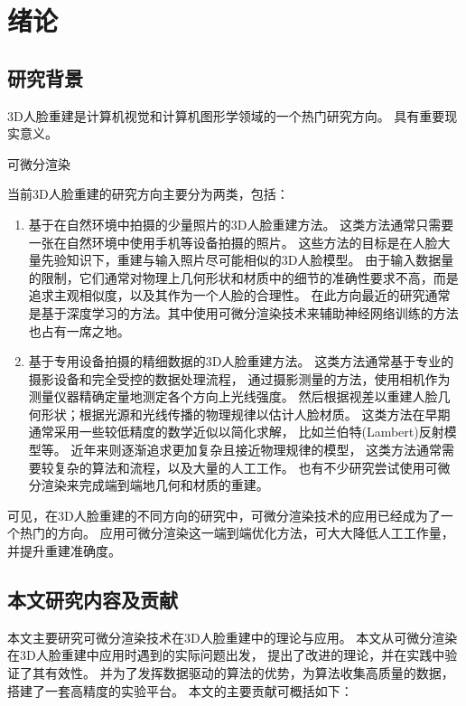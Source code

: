 \chapter{绪论}
\label{chap:intro}

\section{研究背景}

3D人脸重建是计算机视觉和计算机图形学领域的一个热门研究方向。
具有重要现实意义。

可微分渲染

当前3D人脸重建的研究方向主要分为两类，包括：
\begin{enumerate}
\item 基于在自然环境中拍摄的少量照片的3D人脸重建方法。
这类方法通常只需要一张在自然环境中使用手机等设备拍摄的照片。
这些方法的目标是在人脸大量先验知识下，重建与输入照片尽可能相似的3D人脸模型。
由于输入数据量的限制，它们通常对物理上几何形状和材质中的细节的准确性要求不高，而是追求主观相似度，以及其作为一个人脸的合理性。
在此方向最近的研究通常是基于深度学习的方法。其中使用可微分渲染技术来辅助神经网络训练的方法也占有一席之地。

\item 基于专用设备拍摄的精细数据的3D人脸重建方法。
这类方法通常基于专业的摄影设备和完全受控的数据处理流程，
通过摄影测量的方法，使用相机作为测量仪器精确定量地测定各个方向上光线强度。
然后根据视差以重建人脸几何形状；根据光源和光线传播的物理规律以估计人脸材质。
这类方法在早期通常采用一些较低精度的数学近似以简化求解，
比如兰伯特(Lambert)反射模型等。
近年来则逐渐追求更加复杂且接近物理规律的模型，
这类方法通常需要较复杂的算法和流程，以及大量的人工工作。
也有不少研究尝试使用可微分渲染来完成端到端地几何和材质的重建。

\end{enumerate}

可见，在3D人脸重建的不同方向的研究中，可微分渲染技术的应用已经成为了一个热门的方向。
应用可微分渲染这一端到端优化方法，可大大降低人工工作量，并提升重建准确度。

\section{本文研究内容及贡献}

本文主要研究可微分渲染技术在3D人脸重建中的理论与应用。
本文从可微分渲染在3D人脸重建中应用时遇到的实际问题出发，
提出了改进的理论，并在实践中验证了其有效性。
并为了发挥数据驱动的算法的优势，为算法收集高质量的数据，搭建了一套高精度的实验平台。
本文的主要贡献可概括如下：

